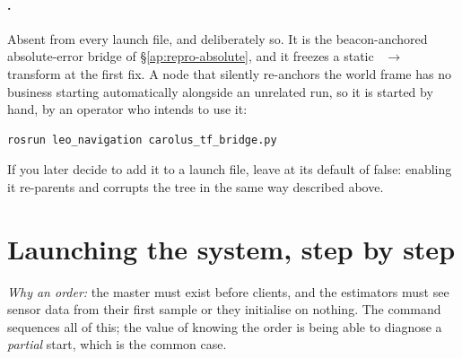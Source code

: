 \paragraph{.} Absent from every launch file, and
deliberately so. It is the beacon-anchored absolute-error bridge of
\S\ref{ap:repro-absolute}, and it freezes a static
~$\to$~ transform at the first fix. A node that
silently re-anchors the world frame has no business starting automatically
alongside an unrelated run, so it is started by hand, by an operator who
intends to use it:
\begin{lstlisting}[language=bash]
rosrun leo_navigation carolus_tf_bridge.py
\end{lstlisting}
If you later decide to add it to a launch file, leave
 at its default of false: enabling
it re-parents  and corrupts the tree in the same way
described above.

\section{Launching the system, step by step}
\label{ap:repro-launch}
\emph{Why an order:} the master must exist before clients, and the estimators
must see sensor data from their first sample or they initialise on nothing. The
 command sequences all of this; the value of knowing the order is
being able to diagnose a \emph{partial} start, which is the common case.

